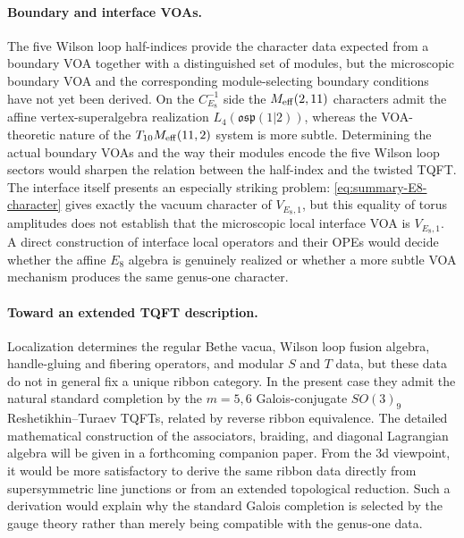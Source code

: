 \documentclass[11pt,a4paper]{article}
\numberwithin{equation}{section}
\begin{document}
\paragraph{Boundary and interface VOAs.}
The five Wilson loop half-indices provide the character data expected from a boundary VOA together with a distinguished set of modules, but the microscopic boundary VOA and the corresponding module-selecting boundary conditions have not yet been derived.  On the $C_{E_8}^{-1}$ side the $M_{\rm eff}(2,11)$ characters admit the affine vertex-superalgebra realization $L_4(\mathfrak{osp}(1|2))$, whereas the VOA-theoretic nature of the $T_{10}M_{\rm eff}(11,2)$ system is more subtle.  Determining the actual boundary VOAs and the way their modules encode the five Wilson loop sectors would sharpen the relation between the half-index and the twisted TQFT.  The interface itself presents an especially striking problem: \eqref{eq:summary-E8-character} gives exactly the vacuum character of $V_{E_8,1}$, but this equality of torus amplitudes does not establish that the microscopic local interface VOA is $V_{E_8,1}$.  A direct construction of interface local operators and their OPEs would decide whether the affine $E_8$ algebra is genuinely realized or whether a more subtle VOA mechanism produces the same genus-one character.

\paragraph{Toward an extended TQFT description.}
Localization determines the regular Bethe vacua, Wilson loop fusion algebra, handle-gluing and fibering operators, and modular $S$ and $T$ data, but these data do not in general fix a unique ribbon category.  In the present case they admit the natural standard completion by the $m=5,6$ Galois-conjugate $SO(3)_9$ Reshetikhin--Turaev TQFTs, related by reverse ribbon equivalence.  The detailed mathematical construction of the associators, braiding, and diagonal Lagrangian algebra will be given in a forthcoming companion paper.  From the 3d viewpoint, it would be more satisfactory to derive the same ribbon data directly from supersymmetric line junctions or from an extended topological reduction.  Such a derivation would explain why the standard Galois completion is selected by the gauge theory rather than merely being compatible with the genus-one data.
\end{document}
